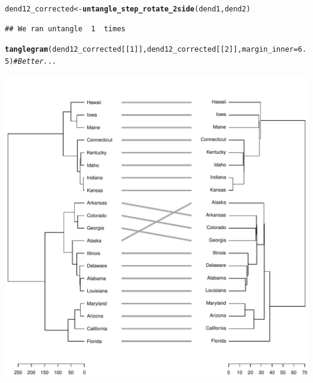 \documentclass[shortnames,nojss,article]{jss}\usepackage[]{graphicx}\usepackage[]{color}
\makeatletter
\def\maxwidth{ %
  \ifdim\Gin@nat@width>\linewidth
    \linewidth
  \else
    \Gin@nat@width
  \fi
}
\newcommand{\hlnum}[1]{\textcolor[rgb]{0.686,0.059,0.569}{#1}}%
\newcommand{\hlcom}[1]{\textcolor[rgb]{0.678,0.584,0.686}{\textit{#1}}}%
\newcommand{\hlstd}[1]{\textcolor[rgb]{0.345,0.345,0.345}{#1}}%
\newcommand{\hlkwb}[1]{\textcolor[rgb]{0.69,0.353,0.396}{#1}}%
\newcommand{\hlkwc}[1]{\textcolor[rgb]{0.333,0.667,0.333}{#1}}%
\newcommand{\hlkwd}[1]{\textcolor[rgb]{0.737,0.353,0.396}{\textbf{#1}}}%
\newenvironment{kframe}{%
 \def\at@end@of@kframe{}%
 \ifinner\ifhmode%
  \def\at@end@of@kframe{\end{minipage}}%
  \begin{minipage}{\columnwidth}%
 \fi\fi%
 \def\FrameCommand##1{\hskip\@totalleftmargin \hskip-\fboxsep
 \colorbox{shadecolor}{##1}\hskip-\fboxsep
     \hskip-\linewidth \hskip-\@totalleftmargin \hskip\columnwidth}%
 \MakeFramed {\advance\hsize-\width
   \@totalleftmargin\z@ \linewidth\hsize
   \@setminipage}}%
 {\par\unskip\endMakeFramed%
 \at@end@of@kframe}
\newenvironment{knitrout}{}{} %
\makeatother
\begin{document}
\begin{knitrout}
\begin{kframe}
\begin{alltt}
\hlstd{dend12_corrected} \hlkwb{<-} \hlkwd{untangle_step_rotate_2side}\hlstd{(dend1, dend2)}
\end{alltt}
\begin{verbatim}
## We ran untangle  1  times
\end{verbatim}
\begin{alltt}
\hlkwd{tanglegram}\hlstd{(dend12_corrected[[}\hlnum{1}\hlstd{]], dend12_corrected[[}\hlnum{2}\hlstd{]],} \hlkwc{margin_inner} \hlstd{=} \hlnum{6.5}\hlstd{)}  \hlcom{# Better...}
\end{alltt}
\end{kframe}

{\centering \includegraphics[width=\maxwidth]{figure/untangle_step_rotate_2side_example3} 

}



\end{knitrout}
\end{document}
